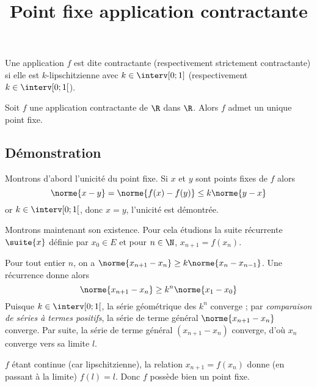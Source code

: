 \documentclass[fontsize=12pt,twoside=false,parskip=half, french]{scrartcl}
\title{Point fixe application contractante}
\date{}
\author{}
\begin{document}
\maketitle
   Une application $f$ est dite contractante (respectivement strictement contractante) si elle est $k$-lipschitzienne avec
   $k \in \interv[0; 1]$ (respectivement $k \in \interv[0; 1[$).
   \begin{Theoreme}
      Soit $f$ une application contractante de $\R$ dans $\R$. Alors $f$ admet un unique point fixe.
   \end{Theoreme}
   \subsection{Démonstration}
      Montrons d’abord l’unicité du point fixe. Si $x$ et $y$ sont points fixes de $f$ alors
      \[
         \norme{x - y} = \norme{f(x) - f(y)} \leq k\norme{y - x}
      \]
      or $k \in \interv[0; 1[$, donc $x = y$, l’unicité est démontrée.

      Montrons maintenant son existence. Pour cela étudions la suite récurrente $\suite{x}$ définie par
      $x_0 \in E$ et pour $n \in \N$, $x_{n + 1} = f(x_n)$.

      Pour tout entier $n$, on a $\norme{x_{n + 1} - x_n} \geq k\norme{x_n - x_{n - 1}}$. Une récurrence donne alors
      \[
         \norme{x_{n + 1} - x_n} \geq k^n\norme{x_1 - x_0}
      \]
      Puisque $k \in \interv[0; 1[$, la série géométrique des $k^n$ converge ; par \emph{comparaison de séries à termes
      positifs}, la série de terme général $\norme{x_{n + 1} - x_n}$ converge. Par suite, la série de terme général
      $(x_{n + 1} - x_n)$ converge, d’où $x_n$ converge vers sa limite $l$.

      $f$ étant continue (car lipschitzienne), la relation $x_{n + 1} = f(x_n)$ donne (en passant à la limite) $f(l) = l$. Donc $f$ possède
      bien un point fixe.
\end{document}
